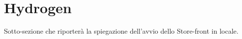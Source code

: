 \section{Hydrogen}

Sotto-sezione che riporterà la spiegazione dell'avvio dello Store-front in locale.

